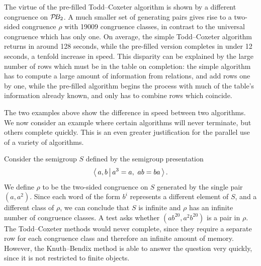 \begin{example}
  \label{ex:good-tc-prefill}
  The virtue of the pre-filled Todd--Coxeter algorithm is shown by a different congruence on
  $\mathcal{P}\!B_2$.  A much smaller set of generating pairs gives rise to a two-sided congruence
  $\rho$ with 19009 congruence classes, in contrast to the universal congruence
  which has only one.  On average, the simple Todd--Coxeter algorithm returns in around 128
  seconds, while the pre-filled version completes in under 12 seconds, a tenfold
  increase in speed.  This disparity can be explained by the large number of
  rows which must be in the table on completion: the simple algorithm has to
  compute a large amount of information from relations, and add rows one by one,
  while the pre-filled algorithm begins the process with much of the table's
  information already known, and only has to combine rows which coincide.
\end{example}

The two examples above show the difference in speed between two algorithms.  We
now consider an example where certain algorithms will never terminate, but
others complete quickly.  This is an even greater justification for the parallel
use of a variety of algorithms.

\begin{example}
  \label{ex:good-kbfp}
  Consider the semigroup $S$ defined by the semigroup presentation
  $$\left\langle \, a,b \, \middle| \, a^3=a,\ ab=ba \, \right\rangle.$$  We define $\rho$ to be the two-sided congruence on $S$
  generated by the single pair $(a, a^2)$.  Since each word of the form $b^i$
  represents a different element of $S$, and a different class of $\rho$, we can
  conclude that $S$ is infinite and $\rho$ has an infinite number of congruence
  classes.  A test asks whether $(ab^{20}, a^2b^{20})$ is a pair in $\rho$.  The
  Todd--Coxeter methods would never complete, since they require a separate row
  for each congruence class and therefore an infinite amount of memory.
  However, the Knuth--Bendix method is able to answer the question very quickly,
  since it is not restricted to finite objects.
\end{example}



